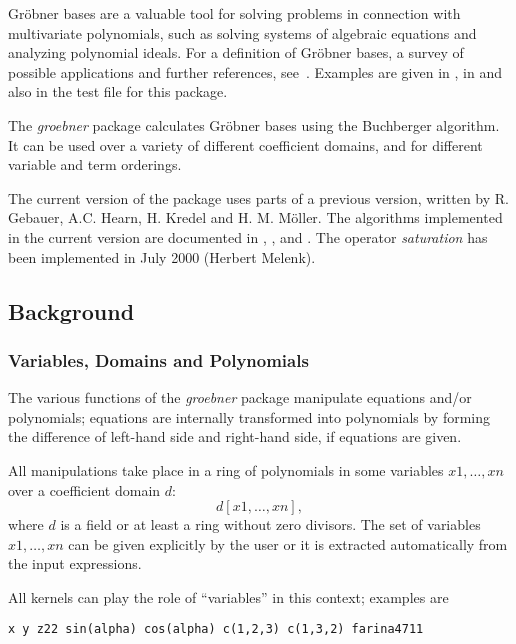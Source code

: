 
Gr\"obner bases are a valuable tool for solving problems in
connection with multivariate polynomials, such as solving systems of
algebraic equations and analyzing polynomial ideals. For a definition
of Gr\"obner bases, a survey of possible applications and further
references, see~\cite{Buchberger:85}. Examples are given in \cite{Boege:86},
in \cite{Buchberger:88} and also in the test file for this package.

 
The \emph{groebner} package calculates Gr\"obner bases using the
Buchberger algorithm.  It can be used over a variety of different
coefficient domains, and for different variable and term orderings.

The current version of the package uses parts of a previous
version, written by  R. Gebauer, A.C. Hearn, H. Kredel and H. M.
M\"oller. The algorithms implemented in the current version are
documented in \cite{Faugere:93}, \cite{Gebauer:88},
\cite{Kredel:88a} and \cite{Giovini:91}.
The operator \emph{saturation} has been implemented in July 2000 (Herbert Melenk).

\subsection{Background}

\subsubsection{Variables, Domains and Polynomials}

The various functions of the \emph{groebner} package manipulate
equations and/or polynomials; equations are internally
transformed into  polynomials by forming the difference of
left-hand side and right-hand side, if equations are given.

All manipulations take place in a ring of polynomials in some
variables $x1, \ldots , xn$ over a coefficient domain $d$:
\[ d [x1,\ldots , xn], \]
where $d$ is a field or at least a ring without zero divisors.
The set of variables $x1,\ldots ,xn$ can be given explicitly by the
user or it is extracted automatically from the
input expressions.

All \REDUCE kernels can play the role of ``variables'' in this context;
examples are

\begin{verbatim}
x y z22 sin(alpha) cos(alpha) c(1,2,3) c(1,3,2) farina4711
\end{verbatim}

